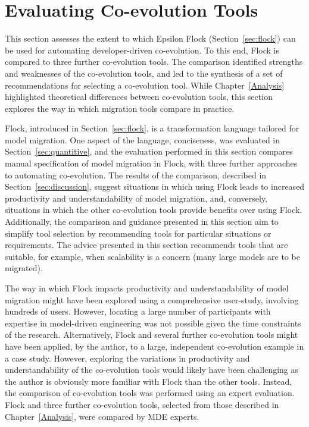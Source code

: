 
\section{Evaluating Co-evolution Tools}
\label{sec:collaborative_comparison}
This section assesses the extent to which Epsilon Flock (Section~\ref{sec:flock}) can be used for automating developer-driven co-evolution. To this end, Flock is compared to three further co-evolution tools. The comparison identified strengths and weaknesses of the co-evolution tools, and led to the synthesis of a set of recommendations for selecting a co-evolution tool. While Chapter~\ref{Analysis} highlighted theoretical differences between co-evolution tools, this section explores the way in which migration tools compare in practice.

Flock, introduced in Section~\ref{sec:flock}, is a transformation language tailored for model migration. One aspect of the language, conciseness, was evaluated in Section~\ref{sec:quantitive}, and the evaluation performed in this section compares manual specification of model migration in Flock, with three further approaches to automating co-evolution. The results of the comparison, described in Section~\ref{sec:discussion}, suggest situations in which using Flock leads to increased productivity and understandability of model migration, and, conversely, situations in which the other co-evolution tools provide benefits over using Flock. Additionally, the comparison and guidance presented in this section aim to simplify tool selection by recommending tools for particular situations or requirements. The advice presented in this section recommends tools that are suitable, for example, when scalability is a concern (many large models are to be migrated).

The way in which Flock impacts productivity and understandability of model migration might have been explored using a comprehensive user-study, involving hundreds of users. However, locating a large number of participants with expertise in model-driven engineering was not possible given the time constraints of the research. Alternatively, Flock and several further co-evolution tools might have been applied, by the author, to a large, independent co-evolution example in a case study. However, exploring the variations in productivity and understandability of the co-evolution tools would likely have been challenging as the author is obviously more familiar with Flock than the other tools. Instead, the comparison of co-evolution tools was performed using an expert evaluation. Flock and three further co-evolution tools, selected from those described in Chapter~\ref{Analysis}, were compared by MDE experts.

